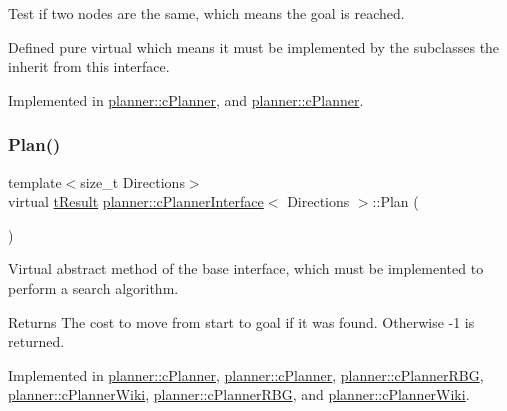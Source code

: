 Test if two nodes are the same, which means the goal is reached. 

Defined pure virtual which means it must be implemented by the subclasses the inherit from this interface. 

Implemented in \mbox{\hyperlink{classplanner_1_1c_planner_a6b7554394efd7ad10d76a49b370aa62f}{planner\+::c\+Planner}}, and \mbox{\hyperlink{classplanner_1_1c_planner_a7050795c7174d0ec427fc91f8756a3d8}{planner\+::c\+Planner}}.

\mbox{\label{classplanner_1_1c_planner_interface_a7a06632a8c53906daf39611d9692ffa5}} 
\subsubsection{\texorpdfstring{Plan()}{Plan()}\hspace{0.1cm}{\footnotesize\ttfamily [1/2]}}
{\footnotesize\ttfamily template$<$size\+\_\+t Directions$>$ \\
virtual \mbox{\hyperlink{structt_result}{t\+Result}} \mbox{\hyperlink{classplanner_1_1c_planner_interface}{planner\+::c\+Planner\+Interface}}$<$ Directions $>$\+::Plan (\begin{DoxyParamCaption}{ }\end{DoxyParamCaption})\hspace{0.3cm}{\ttfamily [pure virtual]}}



Virtual abstract method of the base interface, which must be implemented to perform a search algorithm. 

\begin{DoxyReturn}{Returns}
The cost to move from start to goal if it was found. Otherwise -\/1 is returned. 
\end{DoxyReturn}


Implemented in \mbox{\hyperlink{classplanner_1_1c_planner_a21230c015260b9fc34ad2f239592470e}{planner\+::c\+Planner}}, \mbox{\hyperlink{classplanner_1_1c_planner_a21230c015260b9fc34ad2f239592470e}{planner\+::c\+Planner}}, \mbox{\hyperlink{classplanner_1_1c_planner_r_b_g_a0bbd752702da582a47dbd153c0065eb5}{planner\+::c\+Planner\+R\+BG}}, \mbox{\hyperlink{classplanner_1_1c_planner_wiki_a9d18be721400b51162ff463ab11d1721}{planner\+::c\+Planner\+Wiki}}, \mbox{\hyperlink{classplanner_1_1c_planner_r_b_g_a0bbd752702da582a47dbd153c0065eb5}{planner\+::c\+Planner\+R\+BG}}, and \mbox{\hyperlink{classplanner_1_1c_planner_wiki_a9d18be721400b51162ff463ab11d1721}{planner\+::c\+Planner\+Wiki}}.

